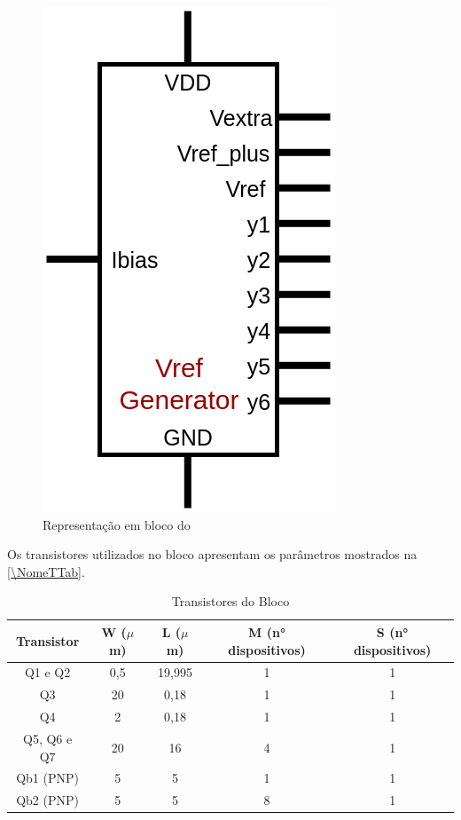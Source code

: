\begin{figure}[htb]
 \centering
    \centering
    \caption{\label{\NomeSFig}Representação em bloco do \NomeBloco}
    \includegraphics[scale=0.3]{Circuitos/vref_generator_block.png}
\end{figure}

Os transistores utilizados no bloco \NomeBloco{} apresentam os par\^ametros mostrados na \autoref{\NomeTTab}.

\begin{table}[!h]
\caption{Transistores do Bloco \NomeBloco}
\label{\NomeTTab}
\centering
\begin{tabular}{ccccc}
\toprule
Transistor & W ($\mu$m)  & L ($\mu$m)           & M (n° dispositivos) & S (n° dispositivos)\\
\midrule \midrule
Q1 e Q2 & 0,5 & 19,995 & 1 & 1\\
\midrule
Q3 & 20 & 0,18 & 1 & 1\\
\midrule
Q4 & 2 & 0,18 & 1 & 1\\
\midrule
Q5, Q6 e Q7 & 20 & 16 & 4 & 1\\
\midrule
Qb1 (PNP) & 5 & 5 & 1 & 1\\
\midrule
Qb2 (PNP) & 5 & 5 & 8 & 1\\
\bottomrule
\end{tabular}
\end{table}

